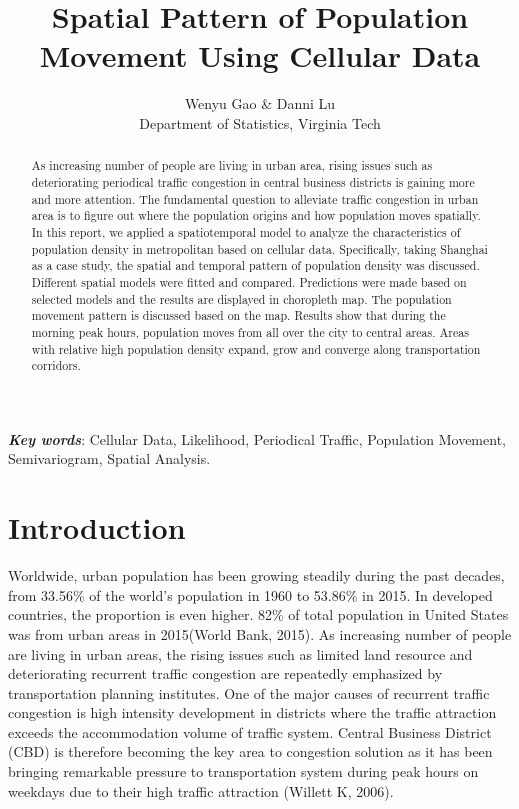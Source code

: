 \documentclass[hidelinks,12pt]{article}
\date{}
\author{Wenyu Gao \& Danni Lu \\ Department of Statistics, Virginia Tech}
\title{Spatial Pattern of Population Movement Using Cellular Data }
\begin{document}
	\maketitle
	
	\begin{abstract}
		As increasing number of people are living in urban area, rising issues such as deteriorating periodical traffic congestion in central business districts is gaining more and more attention. The fundamental question to alleviate traffic congestion in urban area is to figure out where the population origins and how population moves spatially. In this report, we applied a spatiotemporal model to analyze the characteristics of population density in metropolitan based on cellular data. Specifically, taking Shanghai as a case study, the spatial and temporal pattern of population density was discussed. Different spatial models were fitted and compared. Predictions were made based on selected models and the results are displayed in choropleth map. The population movement pattern is discussed based on the map. Results show that during the morning peak hours, population moves from all over the city to central areas. Areas with relative high population density expand, grow and converge along transportation corridors. 
	\end{abstract}
	\textbf{ {\em Key words}}: Cellular Data, Likelihood, Periodical Traffic, Population Movement, Semivariogram, Spatial Analysis.
	
	\section{Introduction}\label{sec:intro}
	Worldwide, urban population has been growing steadily during the past decades, from 33.56\% of the world's population in 1960 to 53.86\% in 2015. In developed countries, the proportion is even higher. 82\% of total population in United States was from urban areas in 2015(World Bank, 2015). As increasing number of people are living in urban areas, the rising issues such as limited land resource and deteriorating recurrent traffic congestion are repeatedly emphasized by transportation planning institutes. One of the major causes of recurrent traffic congestion is high intensity development in districts where the traffic attraction exceeds the accommodation volume of traffic system. Central Business District (CBD) is therefore becoming the key area to congestion solution as it has been bringing remarkable pressure to transportation system during peak hours on weekdays due to their high traffic attraction (Willett K, 2006). 
	
\end{document}
